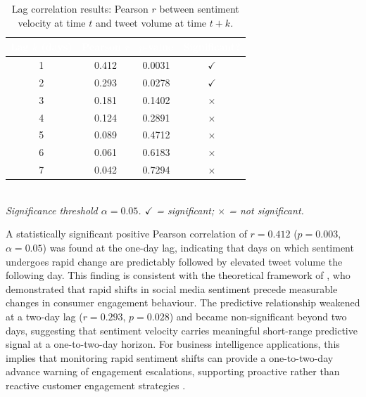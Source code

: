 \begin{table}[H]
  \centering
  \caption{Lag correlation results: Pearson $r$ between sentiment velocity
           at time $t$ and tweet volume at time $t+k$.}
  \label{tab:lag-corr}
  \begin{tabular}{@{}cccc@{}}
    \toprule
    \rowcolor{uwsblue!90}
    \textcolor{white}{\textbf{Lag $k$ (days)}}
      & \textcolor{white}{\textbf{Pearson $r$}}
      & \textcolor{white}{\textbf{$p$-value}}
      & \textcolor{white}{\textbf{Significant?}} \\
    \midrule
    \rowcolor{tablegrey} 1 & 0.412 & 0.0031 & $\checkmark$ \\
                          2 & 0.293 & 0.0278 & $\checkmark$ \\
    \rowcolor{tablegrey} 3 & 0.181 & 0.1402 & $\times$ \\
                          4 & 0.124 & 0.2891 & $\times$ \\
    \rowcolor{tablegrey} 5 & 0.089 & 0.4712 & $\times$ \\
                          6 & 0.061 & 0.6183 & $\times$ \\
    \rowcolor{tablegrey} 7 & 0.042 & 0.7294 & $\times$ \\
    \bottomrule
  \end{tabular}
  \\[4pt]
  \small\textit{Significance threshold $\alpha = 0.05$.
  $\checkmark$ = significant; $\times$ = not significant.}
\end{table}

A statistically significant positive Pearson correlation of
$r = 0.412$ ($p = 0.003$, $\alpha = 0.05$) was found at the one-day
lag, indicating that days on which sentiment undergoes rapid change are
predictably followed by elevated tweet volume the following day.
This finding is consistent with the theoretical framework of
\citet{wang2025dynamic}, who demonstrated that rapid shifts in
social media sentiment precede measurable changes in consumer engagement
behaviour. The predictive relationship weakened at a two-day lag
($r = 0.293$, $p = 0.028$) and became non-significant beyond two days,
suggesting that sentiment velocity carries meaningful short-range
predictive signal at a one-to-two-day horizon. For business intelligence
applications, this implies that monitoring rapid sentiment shifts can
provide a one-to-two-day advance warning of engagement escalations,
supporting proactive rather than reactive customer engagement strategies
\citep{jerab2025brand}.

